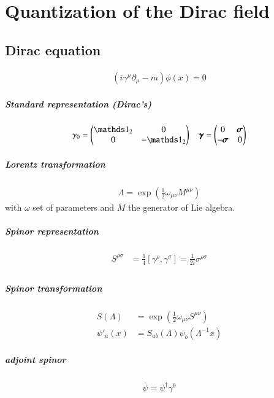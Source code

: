 \chapter{Quantization of the Dirac field}
\section{Dirac equation}
\begin{align}
	\left(i \gamma^\mu \partial_\mu - m \right) \phi(x) = 0
\end{align}
\paragraph{Standard representation (Dirac's)}
\begin{align}
	\gamma_0 = \begin{pmatrix} \id_2 & 0 \\ 0 & -\id_2 \end{pmatrix}
	\quad
	\pmb{\gamma} = \begin{pmatrix} 0 & \pmb{\sigma} \\ -\pmb{\sigma} & 0 \end{pmatrix}
\end{align}
\paragraph{Lorentz transformation}
\begin{align}
	\Lambda = \exp(\frac{1}{2}\omega_{\mu\nu}M^{\mu\nu})
\end{align}
with $\omega$ set of parameters and $M$ the generator of Lie algebra.
\paragraph{Spinor representation}
\begin{align}
	S^{\rho\sigma} &= \frac{1}{4} \left[ \gamma^\rho, \gamma^\sigma \right] = \frac{1}{2i}\sigma^{\rho\sigma} \\
\end{align}
\paragraph{Spinor transformation}
\begin{align}
	S(\Lambda) &= \exp(\frac{1}{2} \omega_{\mu\nu}S^{\mu\nu}) \\
	\psi'_a(x) &= S_{ab}(\Lambda) \psi_b(\Lambda^{-1}x)
\end{align}
\paragraph{adjoint spinor}
\begin{align}
	\bar{\psi} = \psi^\dagger \gamma^0
\end{align}
